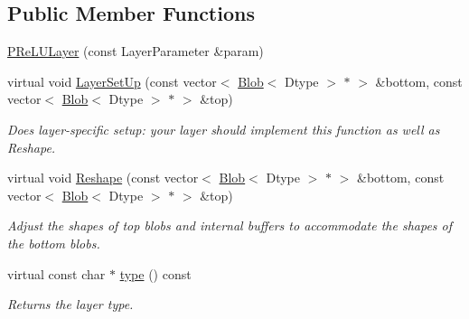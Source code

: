 \subsection*{Public Member Functions}
\begin{DoxyCompactItemize}
\item 
\hyperlink{classcaffe_1_1PReLULayer_a9d164a537a2f77b4143d2491f4809732}{P\+Re\+L\+U\+Layer} (const Layer\+Parameter \&param)
\item 
virtual void \hyperlink{classcaffe_1_1PReLULayer_ad80124134d59ef7eff37601c953f09ef}{Layer\+Set\+Up} (const vector$<$ \hyperlink{classcaffe_1_1Blob}{Blob}$<$ Dtype $>$ $\ast$ $>$ \&bottom, const vector$<$ \hyperlink{classcaffe_1_1Blob}{Blob}$<$ Dtype $>$ $\ast$ $>$ \&top)
\begin{DoxyCompactList}\small\item\em Does layer-\/specific setup\+: your layer should implement this function as well as Reshape. \end{DoxyCompactList}\item 
virtual void \hyperlink{classcaffe_1_1PReLULayer_a49e457fde8b31a97978718345d0ff53a}{Reshape} (const vector$<$ \hyperlink{classcaffe_1_1Blob}{Blob}$<$ Dtype $>$ $\ast$ $>$ \&bottom, const vector$<$ \hyperlink{classcaffe_1_1Blob}{Blob}$<$ Dtype $>$ $\ast$ $>$ \&top)
\begin{DoxyCompactList}\small\item\em Adjust the shapes of top blobs and internal buffers to accommodate the shapes of the bottom blobs. \end{DoxyCompactList}\item 
virtual const char $\ast$ \hyperlink{classcaffe_1_1PReLULayer_a5ef92d5ceec05bae89ea4c72fabe6dc5}{type} () const \hypertarget{classcaffe_1_1PReLULayer_a5ef92d5ceec05bae89ea4c72fabe6dc5}{}\label{classcaffe_1_1PReLULayer_a5ef92d5ceec05bae89ea4c72fabe6dc5}

\begin{DoxyCompactList}\small\item\em Returns the layer type. \end{DoxyCompactList}\end{DoxyCompactItemize}

